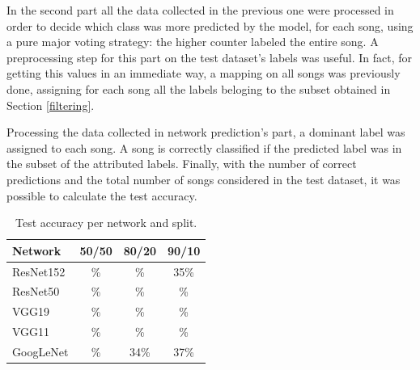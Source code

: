 \documentclass[10pt,twocolumn,letterpaper]{article}
\begin{document}
In the second part all the data collected in the previous one were processed in order to decide which class was more predicted by the model, for each song, using a pure major voting strategy: the higher counter labeled the entire song. A preprocessing step for this part on the test dataset's labels was useful. In fact, for getting this values in an immediate way, a mapping on all songs was previously done, assigning for each song all the labels beloging to the subset obtained in Section \ref{filtering}.

Processing the data collected in network prediction's part, a dominant label was assigned to each song. A song is correctly classified if the predicted label was in the subset of the attributed labels. Finally, with the number of correct predictions and the total number of songs considered in the test dataset, it was possible to calculate the test accuracy.



   \begin{table}[ht]
      \begin{center}
      \def\arraystretch{1.5}
      \begin{tabular}{l|c|c|c}
         \textbf{Network} & \textbf{50/50} & \textbf{80/20} & \textbf{90/10} \\
      \hline
      ResNet152 & \% & \% & 35\% \\
      \hline
      ResNet50 & \% & \% & \% \\
      \hline
      VGG19 & \% & \% & \% \\
      \hline
      VGG11 & \% & \% & \% \\
      \hline
      GoogLeNet & \% & 34\% & 37\% \\
      \end{tabular}
      \end{center}
      \caption{Test accuracy per network and split.}
      \label{tab:test}
      \end{table}
\end{document}
